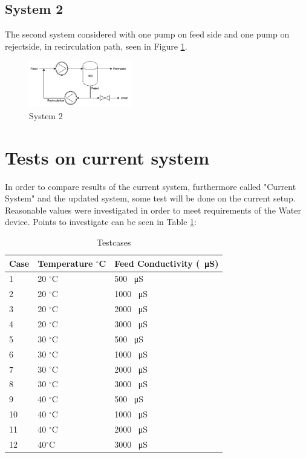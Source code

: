 \subsection{System 2}
The second system considered with one pump on feed side and one pump on rejectside, in recirculation path, seen in Figure \ref{fig:Sys2}.
\begin{figure}[h]
    \centering
    \includegraphics[width=0.4\textwidth]{Sys2}
    \caption{System 2}
    \label{fig:Sys2}
\end{figure}

\section{Tests on current system}
In order to compare results of the current system, furthermore called "Current System" and the updated system, some test will be done on the current setup. Reasonable values were investigated in order to meet requirements of the Water device. Points to investigate can be seen in Table \ref{tab:testcases}:\\
\begin{table}[h]
\begin{tabular}{ |p{1cm}||p{3cm}|p{4cm}|}
 \hline
 \textbf{Case}&Temperature $^\circ$C& Feed Conductivity (\SI{}{\micro\siemens}) \\
 \hline
 1   &   20 $^\circ$C  & 500 \SI{}{\micro\siemens}  \\
 2 &  20 $^\circ$C & 1000 \SI{}{\micro\siemens}  \\
 3 &20 $^\circ$C& 2000 \SI{}{\micro\siemens}\\
 4   &20 $^\circ$C& 3000 \SI{}{\micro\siemens}\\
 \hline
 5 & 30 $^\circ$C & 500 \SI{}{\micro\siemens}\\
 6 & 30 $^\circ$C& 1000 \SI{}{\micro\siemens}\\
 7 & 30 $^\circ$C& 2000 \SI{}{\micro\siemens}\\
 8 & 30 $^\circ$C& 3000 \SI{}{\micro\siemens}\\
 \hline
 9 & 40 $^\circ$C& 500 \SI{}{\micro\siemens}\\
 10 & 40 $^\circ$C & 1000 \SI{}{\micro\siemens}\\
 11 & 40 $^\circ$C& 2000 \SI{}{\micro\siemens}\\
 12 & 40$^\circ$C & 3000 \SI{}{\micro\siemens}\\
\hline
\end{tabular}
\caption{Testcases}
    \label{tab:testcases} 
\end{table}


